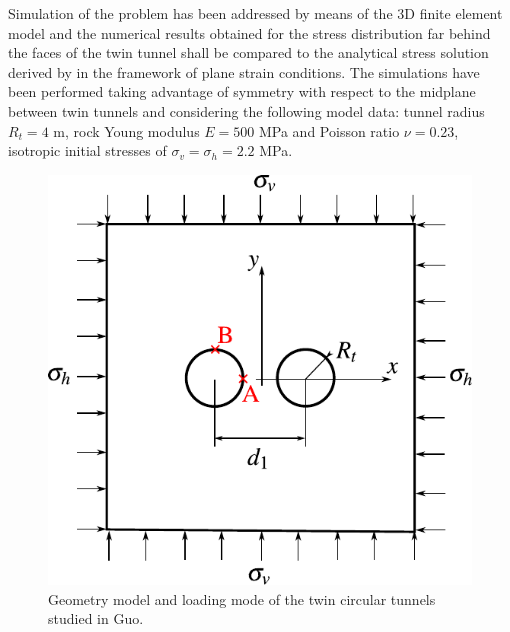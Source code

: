 \documentclass[Journal,letterpaper, NoLists,SectionNumbers]{ascelike-new}
\begin{document}
Simulation of the problem has been addressed by means of the 3D finite element model and the numerical results obtained for the stress distribution far behind the faces of the twin tunnel shall be compared to the analytical stress solution derived by  in the framework of plane strain conditions. The simulations have been performed taking advantage of symmetry with respect to the midplane between twin tunnels and considering the following model data: tunnel radius $R_t = 4$ m, rock Young modulus $E = 500$ MPa and Poisson ratio $\nu = 0.23$, isotropic initial stresses of $\sigma_v = \sigma_h = 2.2$ MPa.
\begin{figure}[h!]
	\centering
	\includegraphics[scale=0.7]{GUO_FIG0.pdf}
	\caption{Geometry model and loading mode of the twin circular tunnels studied in Guo.}
	\label{GUO_FIG0}
\end{figure}
\end{document}
